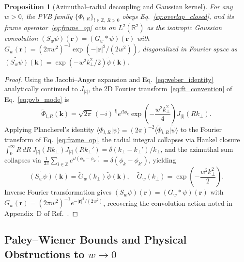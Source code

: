 \documentclass[aps,pra,onecolumn,notitlepage,11pt,tightenlines,amsmath,amssymb,floatfix,longbibliography]{revtex4-2}
\providecommand{\braket}[2]{\langle#1\vert#2\rangle}
\providecommand{\abs}[1]{\lvert#1\rvert}
\newtheorem{proposition}{Proposition}
\begin{document}
\begin{proposition}[Azimuthal--radial decoupling and Gaussian kernel]
\label{prop:conv_kernel}
For any $w > 0$, the PVB family $\{\Phi_{l,R}\}_{l\in\mathbb{Z},\,R>0}$ obeys Eq.~\eqref{eq:overlap_closed}, and its frame operator~\eqref{eq:frame_op} acts on $L^2(\mathbb{R}^2)$ as the isotropic Gaussian convolution $(S_w\psi)(\mathbf{r}) = (G_w * \psi)(\mathbf{r})$ with $G_w(\mathbf{r}) = (2\pi w^2)^{-1}\exp(-\abs{\mathbf{r}}^2/(2w^2))$, diagonalized in Fourier space as $\widetilde{(S_w\psi)}(\mathbf{k}) = \exp(-w^2 k_\perp^2/2)\widetilde{\psi}(\mathbf{k})$.
\end{proposition}
\begin{proof}
Using the Jacobi--Anger expansion and Eq.~\eqref{eq:weber_identity} analytically continued to $J_{\abs{l}}$, the 2D Fourier transform~\eqref{eq:ft_convention} of Eq.~\eqref{eq:pvb_mode} is
\begin{equation}
\widetilde{\Phi}_{l,R}(\mathbf{k}) = \sqrt{2\pi}\,(-i)^{\abs{l}} e^{il\phi_k} \exp\!\left(-\frac{w^2 k_\perp^2}{4}\right) J_{\abs{l}}(R k_\perp).
\label{eq:pvb_ft}
\end{equation}
Applying Plancherel's identity $\braket{\Phi_{l,R}}{\psi} = (2\pi)^{-2}\braket{\widetilde{\Phi}_{l,R}}{\widetilde{\psi}}$ to the Fourier transform of Eq.~\eqref{eq:frame_op}, the radial integral collapses via Hankel closure $\int_0^\infty R\,dR\,J_{\abs{l}}(Rk_\perp)J_{\abs{l}}(Rk_\perp') = \delta(k_\perp - k_\perp')/k_\perp$, and the azimuthal sum collapses via $\frac{1}{2\pi}\sum_{l\in\mathbb{Z}} e^{il(\phi_k-\phi_{k'})} = \delta(\phi_k - \phi_{k'})$, yielding
\begin{equation}
\widetilde{(S_w\psi)}(\mathbf{k}) = \widetilde{G}_w(k_\perp)\widetilde{\psi}(\mathbf{k}), \quad \widetilde{G}_w(k_\perp) = \exp\!\left(-\frac{w^2 k_\perp^2}{2}\right).
\label{eq:fourier_diag}
\end{equation}
Inverse Fourier transformation gives $(S_w\psi)(\mathbf{r}) = (G_w * \psi)(\mathbf{r})$ with $G_w(\mathbf{r}) = (2\pi w^2)^{-1}e^{-\abs{\mathbf{r}}^2/(2w^2)}$, recovering the convolution action noted in Appendix~D of Ref.~\cite{Ferreira2026}.
\end{proof}

\subsection{Paley--Wiener Bounds and Physical Obstructions to \texorpdfstring{$w \to 0$}{w -> 0}}
\label{subsec:paley_wiener}
\end{document}
